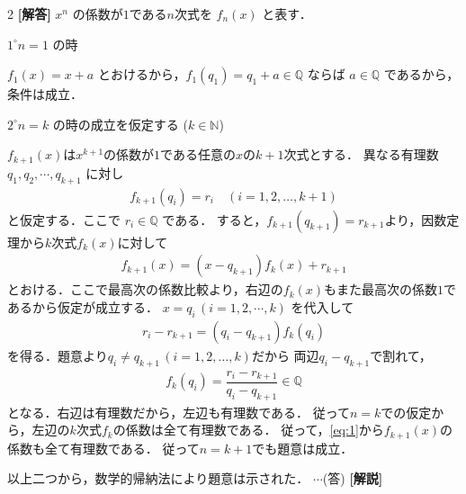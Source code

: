 \documentclass[../../main.tex]{subfiles}
\begin{document}
\setcounter{equation}{0}
\begin{oframed}
  
\end{oframed}
\setlength{\columnseprule}{0.4pt}
\begin{multicols}{2}
  {\bf [解答]}
  $x^n$ の係数が$1$である$n$次式を $f_n(x)$ と表す．

  $1^\circ n=1$ の時

  $f_1(x) = x+a$ とおけるから，$f_1(q_1) = q_1+a \in \mathbb{Q}$ ならば $a \in \mathbb{Q}$ であるから，
  条件は成立．

  $2^\circ n=k$ の時の成立を仮定する ($k \in \mathbb{N}$)

  $f_{k+1}(x)$は$x^{k+1}$の係数が$1$である任意の$x$の$k+1$次式とする．
  異なる有理数 $q_1,q_2,\cdots, q_{k+1}$ に対し
  \begin{align}
    f_{k+1}(q_i) = r_i \quad (i=1, 2, \dots, k+1)
  \end{align}
  と仮定する．ここで $r_i \in \mathbb{Q}$ である．
  すると，$f_{k+1}(q_{k+1})=r_{k+1}$より，因数定理から$k$次式$f_k(x)$に対して
  \begin{align}
    f_{k+1}(x) = (x-q_{k+1})f_k(x) + r_{k+1} \label{eq:1}
  \end{align}
  とおける．ここで最高次の係数比較より，右辺の$f_k(x)$もまた最高次の係数$1$であるから仮定が成立する．
  $x=q_i\, (i=1,2,\cdots,k)$ を代入して
  \begin{align}
    r_i - r_{k+1} = (q_i - q_{k+1}) f_{k}(q_i)
  \end{align}
  を得る．題意より$q_{i} \neq q_{k+1}\, (i=1, 2, \dots, k)$だから
  両辺$q_i - q_{k+1}$で割れて，
  \begin{align}
    f_{k}(q_i) = \dfrac{r_i - r_{k+1}}{q_i - q_{k+1}} \in \mathbb{Q}
  \end{align}
  となる．右辺は有理数だから，左辺も有理数である．
  従って$n=k$での仮定から，左辺の$k$次式$f_{k}$の係数は全て有理数である．
  従って，\cref{eq:1}から$f_{k+1}(x)$の係数も全て有理数である．
  従って$n=k+1$でも題意は成立．

  以上二つから，数学的帰納法により題意は示された．
  $\cdots$(答)
  {\bf [解説]}

  \newpage
\end{multicols}
\end{document}
